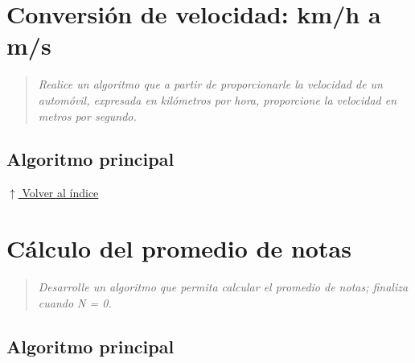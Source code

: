 \documentclass[12pt]{article}
\newcommand{\pseudocodigo}[2]{%
}
\newcommand{\volverindice}{%
    \vspace{1em}%
    \begin{flushright}%
        \hyperlink{indice}{\small $\uparrow$ Volver al índice}%
    \end{flushright}%
}
\newcommand{\enunciado}[1]{%
    \begin{quote}
        \itshape #1
    \end{quote}
}
\begin{document}

\section{Conversión de velocidad: km/h a m/s}

\enunciado{Realice un algoritmo que a partir de proporcionarle la velocidad de un automóvil, expresada en kilómetros por hora, proporcione la velocidad en metros por segundo.}

\subsection{Algoritmo principal}

\pseudocodigo{ej11_kmh_a_ms}{Conversión de km/h a m/s}





\volverindice
\newpage


\section{Cálculo del promedio de notas}

\enunciado{Desarrolle un algoritmo que permita calcular el promedio de notas; finaliza cuando N = 0.}

\subsection{Algoritmo principal}

\pseudocodigo{ej12_promedio_notas}{Promedio de notas}

\end{document}
